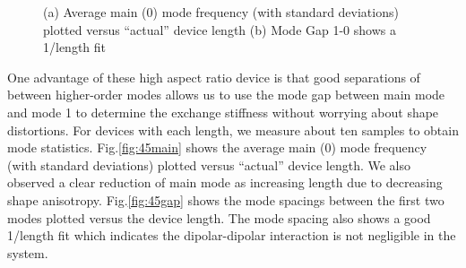 \begin{figure}[!ht]
\centering
{}
\caption{(a) Average main (0) mode frequency (with standard deviations) plotted versus “actual” device length (b) Mode Gap 1-0 shows a 1/length fit }
\end{figure}

One advantage of these high aspect ratio device is that good separations of between higher-order modes allows us to use the mode gap between main mode and mode 1 to determine the exchange stiffness without worrying about shape distortions. For devices with each length, we measure about ten samples to obtain mode statistics. Fig.\ref{fig:45main} shows the average main (0) mode frequency (with standard deviations) plotted versus “actual” device length. We also observed a clear reduction of main mode as increasing length due to decreasing shape anisotropy. Fig.\ref{fig:45gap} shows the mode spacings between the first two modes plotted versus the device length. The mode spacing also shows a good 1/length fit which indicates the dipolar-dipolar interaction is not negligible in the system.

